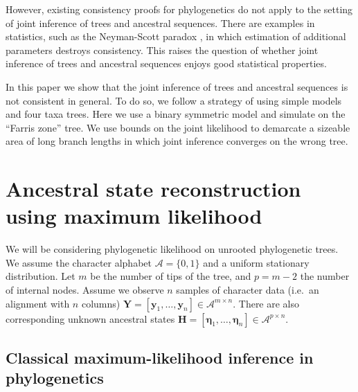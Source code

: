 \documentclass[a4paper]{article}
\newcommand{\alphabet}{\mathcal{A}}
\newcommand{\fullAlignment}{\mathbf{Y}}
\newcommand{\alignmentColumn}{\mathbf{y}}
\newcommand{\fullAncestralStates}{\mathbf{H}}
\newcommand{\ancestralStateColumn}{\boldsymbol\eta}
\newcommand{\nSiteRows}{m}
\newcommand{\nAncestralStateRows}{p}
\begin{document}
However, existing consistency proofs for phylogenetics \cite{RoyChoudhury2015-ta} do not apply to the setting of joint inference of trees and ancestral sequences.
There are examples in statistics, such as the Neyman-Scott paradox \cite{Neyman1948-tt}, in which estimation of additional parameters destroys consistency.
This raises the question of whether joint inference of trees and ancestral sequences enjoys good statistical properties.

In this paper we show that the joint inference of trees and ancestral sequences is not consistent in general.
To do so, we follow a strategy of using simple models and four taxa trees.
Here we use a binary symmetric model and simulate on the ``Farris zone'' \cite{Siddall1998-hq} tree.
We use bounds on the joint likelihood to demarcate a sizeable area of long branch lengths in which joint inference converges on the wrong tree.

\section{Ancestral state reconstruction using maximum likelihood}

We will be considering phylogenetic likelihood on unrooted phylogenetic trees.
We assume the character alphabet $\alphabet=\{0,1\}$ and a uniform stationary distribution.
Let $m$ be the number of tips of the tree, and $p = m-2$ the number of internal nodes.
Assume we observe $n$ samples of character data (i.e.\ an alignment with $n$ columns) $\fullAlignment=[\alignmentColumn_1,\ldots,\alignmentColumn_n]\in\alphabet^{\nSiteRows\times n}$.
There are also corresponding unknown ancestral states $\fullAncestralStates=[\ancestralStateColumn_1,\ldots,\ancestralStateColumn_n]\in\alphabet^{\nAncestralStateRows\times n}$.

\subsection{Classical maximum-likelihood inference in phylogenetics}
\end{document}
